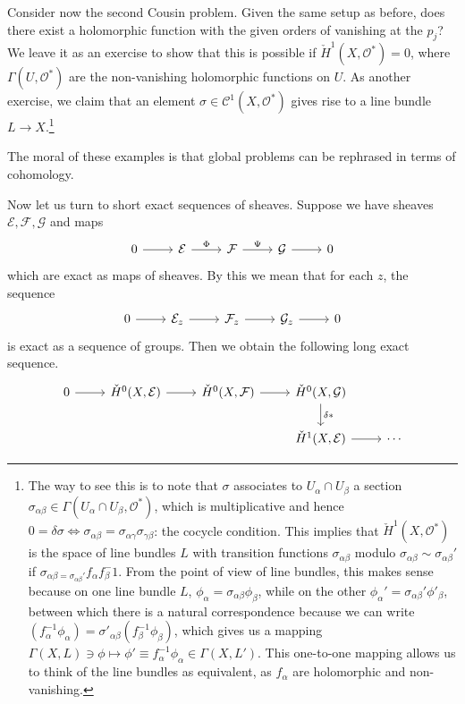 \documentclass{../mathnotes}
\begin{document}
\begin{exmp}
    Consider now the second Cousin problem. Given the same setup as before, does there exist a holomorphic function
    with the given orders of vanishing at the $p_j$? We leave it as an exercise to show that this is possible
    if $\check H^1(X,\mathcal{O}^*)=0$, where $\Gamma(U,\mathcal{O}^*)$ are the non-vanishing holomorphic functions
    on $U$. As another exercise, we claim that an element $\sigma\in\mathcal{C}^1(X,\mathcal{O}^*)$ gives rise
    to a line bundle $L\to X$.\footnote{The way to see this is to note that $\sigma$ associates to $U_\alpha\cap U_\beta$
        a section $\sigma_{\alpha\beta}\in\Gamma(U_\alpha\cap U_\beta,\mathcal{O}^*)$, which is multiplicative and hence
        $0=\delta\sigma\iff\sigma_{\alpha\beta}=\sigma_{\alpha\gamma}\sigma_{\gamma\beta}$: the cocycle condition.
        This implies that $\check H^1(X,\mathcal{O}^*)$ is the space of line bundles $L$ with transition functions $\sigma_{\alpha\beta}$
        modulo $\sigma_{\alpha\beta}\sim\sigma_{\alpha\beta}'$ if $\sigma_{\alpha\beta=\sigma_{\alpha\beta}'}f_\alpha f_\beta^-1$.
        From the point of view of line bundles, this makes sense because on one line bundle $L$, $\phi_\alpha=\sigma_{\alpha\beta}\phi_\beta$,
        while on the other $\phi_\alpha'=\sigma_{\alpha\beta}'\phi'_\beta$, between which there is a natural correspondence because
        we can write $(f_\alpha^{-1}\phi_\alpha)=\sigma'_{\alpha\beta}(f_\beta^{-1}\phi_\beta)$, which gives us a mapping
        $\Gamma(X,L)\ni\phi\mapsto\phi'\equiv f_\alpha^{-1}\phi_\alpha\in\Gamma(X,L')$. This one-to-one mapping allows
        us to think of the line bundles as equivalent, as $f_\alpha$ are holomorphic and non-vanishing.}
\end{exmp}
The moral of these examples is that global problems can be rephrased in terms of cohomology.

Now let us turn to short exact sequences of sheaves. Suppose we have sheaves $\mathcal{E},\mathcal{F},\mathcal{G}$
and maps
\begin{equation*}
    \begin{tikzcd}
        0\arrow{r}&\mathcal{E}\arrow{r}{\Phi}&\mathcal{F}\arrow{r}{\Psi}&\mathcal{G}\arrow{r}&0
    \end{tikzcd}
\end{equation*}
which are exact as maps of sheaves. By this we mean that for each $z$,
the sequence
\begin{equation*}
    \begin{tikzcd}
        0\arrow{r}&\mathcal{E}_z\arrow{r}&\mathcal{F}_z\arrow{r}&\mathcal{G}_z\arrow{r}&0
    \end{tikzcd}
\end{equation*}
is exact as a sequence of groups. Then we obtain the following long exact sequence.
\begin{equation*}
    \begin{tikzcd}
        0\arrow{r}&\check H^0(X,\mathcal{E})\arrow{r}&\check H^0(X,\mathcal{F})\arrow{r}&\check H^0(X,\mathcal{G})\arrow{d}{\delta*}&\\
        &&&\check H^1(X,\mathcal{E})\arrow{r}&\cdots
    \end{tikzcd}
\end{equation*}
\end{document}
